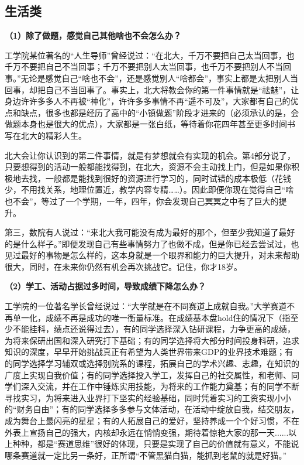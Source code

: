 \documentclass[11pt,oneside]{book}
\begin{document}
\subsection{生活类}
\textbf{（1）除了做题，感觉自己其他啥也不会怎么办？}

工学院某位著名的“人生导师”曾经说过：“在北大，千万不要把自己太当回事，也千万不要把自己不当回事；千万不要把别人太当回事，也千万不要把别人不当回事。”无论是感觉自己“啥也不会”，还是感觉别人“啥都会”，事实上都是太把别人当回事，却把自己不当回事了。事实上，北大将教会你的第一件事情就是“祛魅”，让身边许许多多人不再被“神化”，许许多多事情不再“遥不可及”，大家都有自己的优点和缺点，很多也都是经历了高中的“小镇做题”阶段才进来的（必须承认的是，会做题本身也是很大的优点），大家都是一张白纸，等待着你花四年甚至更多时间书写在北大的精彩人生。

北大会让你认识到的第二件事情，就是有梦想就会有实现的机会。第4部分说了，只要想得到的活动一般都能找得到，在北大，资源不会主动找上门，但是如果你积极地去找，一般都是能找到很好的资源进行学习的，同时试错的成本极低（花钱少，不用找关系，地理位置近，教学内容专精……）。因此即便你现在觉得自己“啥也不会”，等过了一个学期，一年，四年，你会发现自己冥冥之中有了巨大的提升。

第三，数院有人说过：“来北大我可能没有成为最好的那个，但至少我知道了最好的是什么样子。”即便发现自己有些事情努力了也做不成，但是你已经去尝试过，也见过最好的事物是怎么样的，这本身就是一个眼界和能力的巨大提升，对未来帮助很大，同时，在未来你仍然有机会再次挑战它。记住，你才18岁。


\textbf{（2）学工、活动占据过多时间，导致成绩下降怎么办？}

工学院的一位著名学长曾经说过：“大学就是在不同赛道上成就自我。”大学赛道不再单一化，成绩不再是成功的唯一衡量标准。在成绩基本盘hold住的情况下（指至少不能挂科，绩点还说得过去），有的同学选择深入钻研课程，力争更高的成绩，为将来保研出国和深入研究打下基础；有的同学选择将大部分时间投身科研，追求知识的深度，早早开始挑战真正有希望为人类世界带来GDP的业界技术难题；有的同学选择学习辅双或选择别院系的课程，拓展自己的学术兴趣、志趣，在知识的广度上实现自我价值；有的同学选择投入学工，发挥自己的社交属性，和老师、同学们深入交流，并在工作中锤炼实用技能，为将来的工作能力奠基；有的同学不断寻找实习，为将来进入业界打下坚实的经验基础，同时凭着实习的工资实现小小的“财务自由”；有的同学选择多多参与文体活动，在活动中绽放自我，结交朋友，成为舞台上最闪亮的星星；有的人拓展自己的爱好，坚持养成一个个好习惯，不在外表上宣扬自己的强大，内核却永远在悄悄变强，期待着惊艳大家的那一天......以上种种，都是“赛道思维”很好的体现，只要是实现了自己的价值就有意义，不能说哪条赛道就一定比另一条好，正所谓“不管黑猫白猫，能抓到老鼠的就是好猫。”
\end{document}
